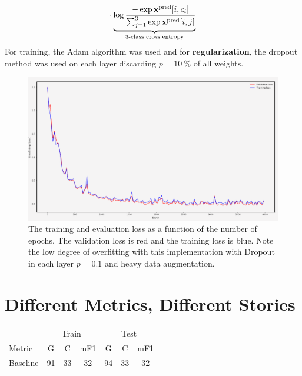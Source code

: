 \documentclass[
    ,title     = {{Image Segmentation for Smart Agriculture}}
    ,subject   = {{This is the subject of my work}}
    ,papersize = {{a1paper}}
    ,nocrop
]{dtuposter}
\begin{document}
\begin{dtupostercontent}
\[\cdot 
\underbrace{
\log 
\frac
{-\exp\mathbf x^\text{pred}[i, c_i]}
{\sum_{j=1}^{3}\exp\mathbf x^\text{pred}[i, j]}
}_{\mathclap{\text{3-class cross entropy}}}
\]
For training, the Adam algorithm was used and for \textbf{regularization}, the dropout method was used on each layer discarding \(p=10\ \%\)  of all weights.
\begin{figure}
	\begin{center}
			\includegraphics[width=\linewidth,origin=c]{loss3}
	\end{center}
	\caption{The training and evaluation loss as a function of the number of epochs. The validation loss is red and the training loss is blue. Note the low degree of overfitting with this implementation with Dropout in each layer \(p=0.1\) and heavy data augmentation.}\label{fig:example2}
\end{figure}



\section{Different Metrics, Different Stories}


\begin{table}
	\centering 
	\begin{tabular}{l|ccc|ccc|}
		
		\rule[-1ex]{0pt}{2.5ex}  & \multicolumn{3}{c|}{Train} &  \multicolumn{3}{c|}{Test} \\ 
		
		\rule[-1ex]{0pt}{2.5ex} Metric  & G & C &  mF1 & G & C &  mF1 \\ 
		\hline
		\rule[-1ex]{0pt}{2.5ex} Baseline& 91& 33   &32  &94  &33  &32  \\ 
		

\end{tabular}
\end{table}
\end{dtupostercontent}
\end{document}
